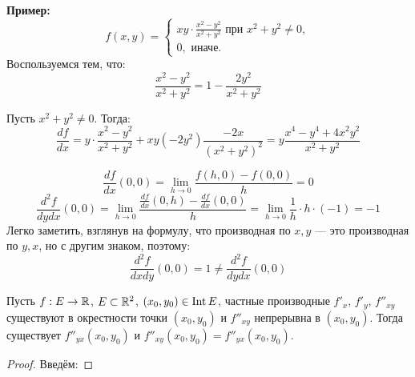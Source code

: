 \textbf{Пример:}
$$
f(x, y) = \begin{cases}
    xy \cdot \frac{x^2 - y^2}{x^2 + y^2} \text{ при } x^2 + y^2 \neq 0,\\
    0, \text{ иначе.}
\end{cases}
$$
Воспользуемся тем, что:
$$\frac{x^2 - y^2}{x^2 + y^2} = 1 - \frac{2y^2}{x^2 + y^2}$$

Пусть $x^2 + y^2 \neq 0$. Тогда:
$$\frac{df}{dx} = y \cdot \frac{x^2 - y^2}{x^2 + y^2} + 
xy(-2y^2) \frac{-2x}{(x^2 + y^2)^2} =
y\frac{x^4 - y^4 + 4x^2y^2}{x^2 + y^2}$$

$$\frac{df}{dx}(0, 0) = \lim_{h \to 0} \frac{f(h, 0) - f(0, 0)}{h} = 0$$
$$\frac{d^2f}{dy dx} (0, 0) = \lim_{h \to 0} 
\frac{\frac{df}{dx}(0, h) - \frac{df}{dx}(0, 0)}{h} =
\lim_{h \to 0} \frac{1}{h} \cdot h \cdot (-1) = -1
$$
Легко заметить, взглянув на формулу, что производная по $x, y$ ---
это производная по $y, x$, но с другим знаком, поэтому:
$$\frac{d^2f}{dx dy} (0, 0) = 1 \neq \frac{d^2f}{dy dx} (0, 0)$$

\begin{theorem}
    Пусть $f : E \to \mathbb{R}$, $E \subset \mathbb{R}^2$, $(x_0, y_0) \in \operatorname{Int} E$,
    частные производные $f'_x$, $f'_y$, $f''_{xy}$ существуют в
    окрестности точки $(x_0, y_0)$ и $f''_{xy}$ непрерывна в 
    $(x_0, y_0)$. Тогда существует $f''_{yx}(x_0, y_0)$ и 
    $f''_{xy}(x_0, y_0) = f''_{yx}(x_0, y_0)$.
\end{theorem}
\begin{proof}
    Введём:
    
\end{proof}